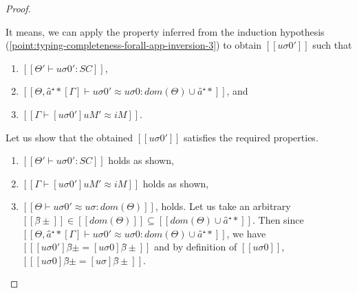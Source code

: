 \begin{proof}
\begin{caseof}
\begin{enumerate}
                    It means, we can apply the property inferred from the induction hypothesis 
                    (\ref{point:typing-completeness-forall-app-inversion-3})
                    to obtain $[[uσ0']]$ such that 
                    \begin{enumerate}
                        \item $[[Θ' ⊢ uσ0' : SC]]$,
                        \item $[[Θ, â⁺*[Γ] ⊢ uσ0' ≈ uσ0 : dom(Θ) ∪ {â⁺*}]]$, and 
                        \item $[[Γ ⊢ [uσ0']uM' ≈ iM]]$.
                    \end{enumerate}

                    Let us show that the obtained $[[uσ0']]$ satisfies the required properties.
                    \begin{enumerate}
                        \item $[[Θ' ⊢ uσ0' : SC]]$ holds as shown,
                        \item $[[Γ ⊢ [uσ0']uM' ≈ iM]]$ holds as shown,
                        \item $[[Θ ⊢ uσ0' ≈ uσ : dom(Θ)]]$,
                            holds. Let us take an arbitrary 
                            $[[β̂±]] \in [[dom(Θ)]] \subseteq [[dom(Θ) ∪ {â⁺*}]]$. Then 
                            since $[[Θ, â⁺*[Γ] ⊢ uσ0' ≈ uσ0 : dom(Θ) ∪ {â⁺*}]]$, 
                            we have $[[ [uσ0']β̂±  = [uσ0]β̂± ]]$ and 
                            by definition of $[[uσ0]]$, $[[ [uσ0]β̂±  = [uσ]β̂± ]]$.
                    \end{enumerate}
            \end{enumerate}
            

\end{caseof}
\end{proof}
